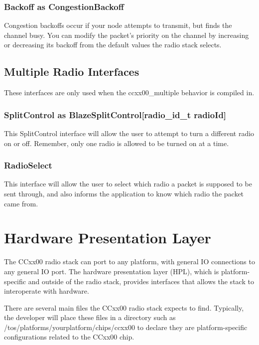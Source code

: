 \documentclass{article}
\begin{document}
\subsubsection{Backoff as CongestionBackoff}
Congestion backoffs occur if your node attempts to transmit, but finds the channel busy.
You can modify the packet's priority on the channel by increasing or decreasing its backoff
from the default values the radio stack selects.

\subsection{Multiple Radio Interfaces}
\label{sec:multipleradiointerfaces}
These interfaces are only used when the ccxx00\_multiple behavior is compiled in.

\subsubsection{SplitControl as BlazeSplitControl[radio\_id\_t radioId]}
This SplitControl interface will allow the user to attempt to turn a different radio
on or off. Remember, only one radio is allowed to be turned on at a time.

\subsubsection{RadioSelect}
This interface will allow the user to select which radio a packet is supposed to be
sent through, and also informs the application to know which radio the packet came from.


\section{Hardware Presentation Layer}
\label{sec:HardwarePresentationLayer}

The CCxx00 radio stack can port to any platform, with general IO connections to any
general IO port.  The hardware presentation layer (HPL), which is platform-specific and outside
of the radio stack, provides interfaces that allows the stack to interoperate with hardware.

There are several main files the CCxx00 radio stack expects to find. Typically, the developer
will place these files in a directory such as /tos/platforms/yourplatform/chips/ccxx00
to declare they are platform-specific configurations related to the CCxx00 chip.
\end{document}
